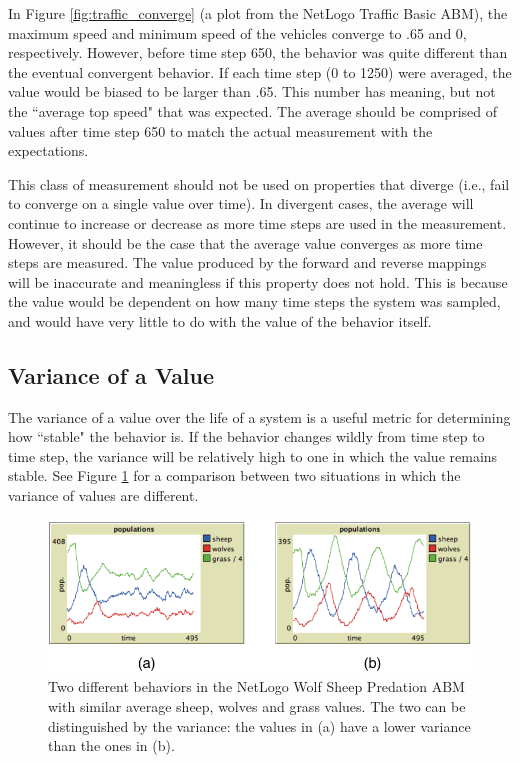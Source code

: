 In Figure \ref{fig:traffic_converge} (a plot from the NetLogo Traffic Basic ABM), the maximum speed and minimum speed of the vehicles converge to .65 and 0, respectively.
However, before time step 650, the behavior was quite different than the eventual convergent behavior.
If each time step (0 to 1250) were averaged, the value would be biased to be larger than .65.
This number has meaning, but not the ``average top speed" that was expected.
The average should be comprised of values after time step 650 to match the actual measurement with the expectations.

This class of measurement should not be used on properties that diverge (i.e., fail to converge on a single value over time).
In divergent cases, the average will continue to increase or decrease as more time steps are used in the measurement.
However, it should be the case that the average value converges as more time steps are measured.
The value produced by the forward and reverse mappings will be inaccurate and meaningless if this property does not hold.
This is because the value would be dependent on how many time steps the system was sampled, and would have very little to do with the value of the behavior itself.

\subsection{Variance of a Value}
The variance of a value over the life of a system is a useful metric for determining how ``stable" the behavior is.
If the behavior changes wildly from time step to time step, the variance will be relatively high to one in which the value remains stable.
See Figure \ref{fig:variance_compare} for a comparison between two situations in which the variance of values are different.

\begin{figure}[ht]
\centering
\includegraphics{images/variance_comparison.pdf}
\caption{Two different behaviors in the NetLogo Wolf Sheep Predation ABM with similar average sheep, wolves and grass values. The two can be distinguished by the variance: the values in (a) have a lower variance than the ones in (b).}
\label{fig:variance_compare}
\end{figure}

